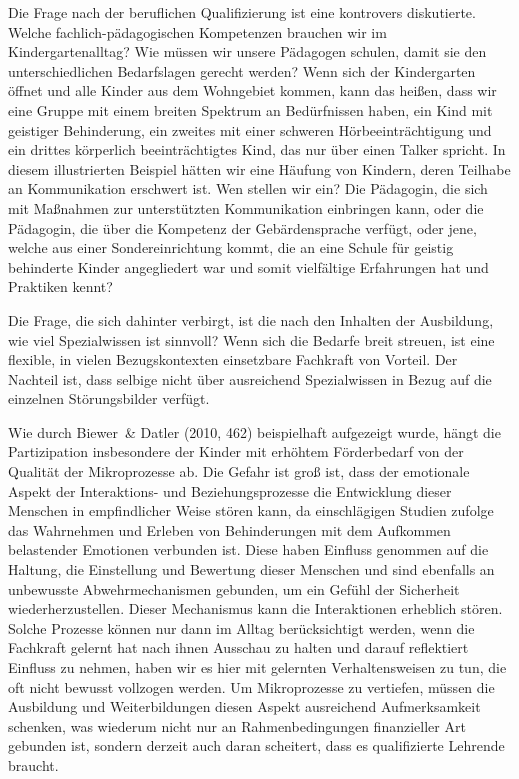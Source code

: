 Die Frage nach der beruflichen Qualifizierung ist eine kontrovers diskutierte. Welche fachlich-pädagogischen Kompetenzen brauchen wir im Kindergartenalltag? Wie müssen wir unsere Pädagogen schulen, damit sie den unterschiedlichen Bedarfslagen gerecht werden? Wenn sich der Kindergarten öffnet und alle Kinder aus dem Wohngebiet kommen, kann das heißen, dass wir eine Gruppe mit einem breiten Spektrum an Bedürfnissen haben, ein Kind mit geistiger Behinderung, ein zweites mit einer schweren Hörbeeinträchtigung und ein drittes körperlich beeinträchtigtes Kind, das nur über einen Talker spricht.
In diesem illustrierten Beispiel hätten wir eine Häufung von Kindern, deren Teilhabe an Kommunikation erschwert ist. Wen stellen wir ein? Die Pädagogin, die sich mit Maßnahmen zur unterstützten Kommunikation einbringen kann, oder die Pädagogin, die über die Kompetenz der Gebärdensprache verfügt, oder jene, welche aus einer Sondereinrichtung kommt, die an eine Schule für geistig behinderte Kinder angegliedert war und somit vielfältige Erfahrungen hat und Praktiken kennt? 

Die Frage, die sich dahinter verbirgt, ist die nach den Inhalten der Ausbildung, wie viel Spezialwissen ist sinnvoll? Wenn sich die Bedarfe breit streuen, ist eine flexible, in vielen Bezugskontexten einsetzbare Fachkraft von Vorteil. Der Nachteil ist, dass selbige nicht über ausreichend Spezialwissen in Bezug auf die einzelnen Störungsbilder verfügt.

Wie durch Biewer~\& Datler (2010, 462) beispielhaft aufgezeigt wurde, hängt die Partizipation insbesondere der Kinder mit erhöhtem Förderbedarf von der Qualität der Mikroprozesse ab. Die Gefahr ist groß ist, dass der emotionale Aspekt der Interaktions- und Beziehungsprozesse die Entwicklung dieser Menschen in empfindlicher Weise stören kann, da einschlägigen Studien zufolge das Wahrnehmen und Erleben von Behinderungen mit dem Aufkommen belastender Emotionen verbunden ist. Diese haben Einfluss genommen auf die Haltung, die Einstellung und Bewertung dieser Menschen und sind ebenfalls an unbewusste Abwehrmechanismen gebunden, um ein Gefühl der Sicherheit wiederherzustellen. Dieser Mechanismus kann die Interaktionen erheblich stören. Solche Prozesse können nur dann im Alltag berücksichtigt werden, wenn die Fachkraft gelernt hat nach ihnen Ausschau zu halten und darauf reflektiert Einfluss zu nehmen, haben wir es hier mit gelernten Verhaltensweisen zu tun, die oft nicht bewusst vollzogen werden. Um Mikroprozesse zu vertiefen, müssen die Ausbildung und Weiterbildungen diesen Aspekt ausreichend Aufmerksamkeit schenken, was wiederum nicht nur an Rahmenbedingungen finanzieller Art gebunden ist, sondern derzeit auch daran scheitert, dass es qualifizierte Lehrende braucht.  
    
